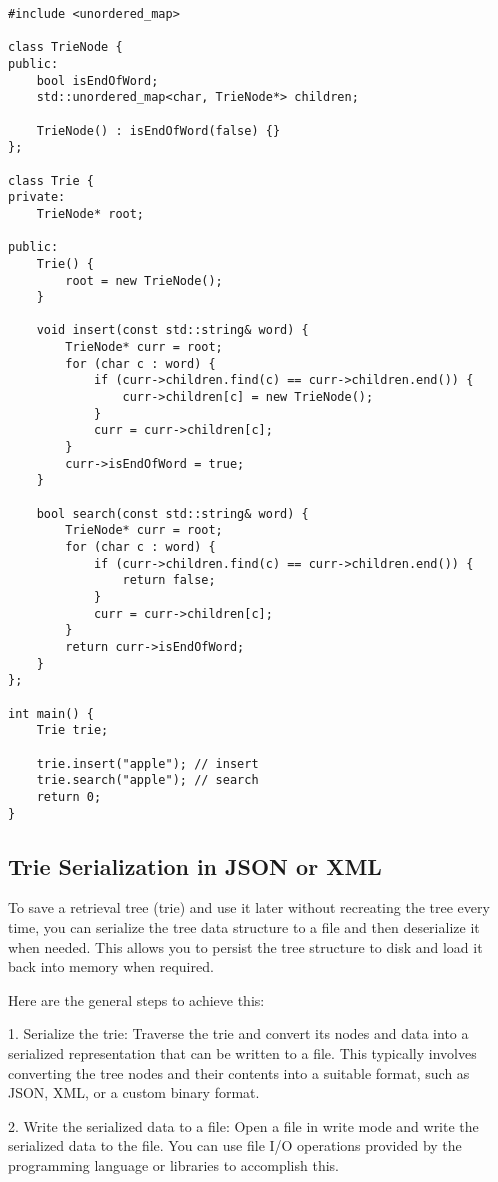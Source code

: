 \documentclass[openany]{report}
\begin{document}
\begin{verbatim}
#include <unordered_map>

class TrieNode {
public:
    bool isEndOfWord;
    std::unordered_map<char, TrieNode*> children;

    TrieNode() : isEndOfWord(false) {}
};

class Trie {
private:
    TrieNode* root;

public:
    Trie() {
        root = new TrieNode();
    }

    void insert(const std::string& word) {
        TrieNode* curr = root;
        for (char c : word) {
            if (curr->children.find(c) == curr->children.end()) {
                curr->children[c] = new TrieNode();
            }
            curr = curr->children[c];
        }
        curr->isEndOfWord = true;
    }

    bool search(const std::string& word) {
        TrieNode* curr = root;
        for (char c : word) {
            if (curr->children.find(c) == curr->children.end()) {
                return false;
            }
            curr = curr->children[c];
        }
        return curr->isEndOfWord;
    }
};

int main() {
    Trie trie;
    
    trie.insert("apple"); // insert
    trie.search("apple"); // search
    return 0;
}
\end{verbatim}

\subsection{Trie Serialization in JSON or XML}

To save a retrieval tree (trie) and use it later without recreating the tree every time,
you can serialize the tree data structure to a file and then deserialize it when needed.
This allows you to persist the tree structure to disk and load it back into memory when required.

Here are the general steps to achieve this:

1. Serialize the trie: Traverse the trie and convert its nodes and data
into a serialized representation that can be written to a file.
This typically involves converting the tree nodes and their contents into
a suitable format, such as JSON, XML, or a custom binary format.

2. Write the serialized data to a file:
Open a file in write mode and write the serialized data to the file.
You can use file I/O operations provided by the programming language or libraries to accomplish this.
\end{document}

